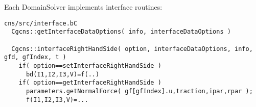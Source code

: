 \noindent Each DomainSolver implements interface routines: 
{
\small
\begin{verbatim}
cns/src/interface.bC
  Cgcns::getInterfaceDataOptions( info, interfaceDataOptions ) 

  Cgcns::interfaceRightHandSide( option, interfaceDataOptions, info, gfd, gfIndex, t )
    if( option==setInterfaceRightHandSide )
      bd(I1,I2,I3,V)=f(..)
    if( option==getInterfaceRightHandSide )
      parameters.getNormalForce( gf[gfIndex].u,traction,ipar,rpar );
      f(I1,I2,I3,V)=...
\end{verbatim}
}


